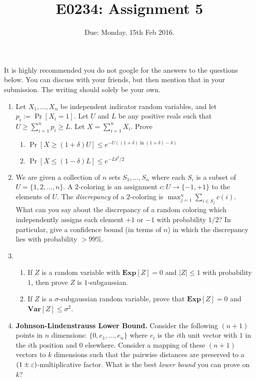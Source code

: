 \documentclass[11pt]{article}
\begin{document}
\def\Exp{\mathbf{Exp}}
\def\Var{\mathbf{Var}}
\title{E0234: Assignment 5}
\author{}
\date{Due: Monday, 15th Feb 2016.}
\maketitle
It is highly recommended you do not google for the answers to the questions below. You can discuss with your friends, but then mention that in your submission.
The writing should solely be your own.

\begin{enumerate}

\item Let $X_1,\ldots , X_n$ be independent indicator random variables, and let $p_i := \Pr[X_i = 1]$.
Let $U$ and $L$ be any positive reals such that $U \geq \sum_{i=1}^n p_i \geq L$. Let $X = \sum_{i=1}^n X_i$.
Prove
\begin{enumerate}
	\item $\Pr\left[X \geq (1+\delta)U\right] \leq e^{-U((1+\delta)\ln(1+\delta) -\delta)}$
	\item $\Pr\left[X \leq (1-\delta)L\right] \leq e^{-L\delta^2/2}$
\end{enumerate}

\item  We are given a collection of $n$ sets $S_1,\ldots,S_n$ where each $S_i$ is a subset of $U = \{1,2,\ldots,n\}$.
A $2$-coloring is an assignment  $c:U \to \{-1,+1\}$ to the elements of $U$.
The {\em discrepancy} of a $2$-coloring is $\max_{j=1}^n \sum_{i\in S_j} c(i)$. 
What can you say about the discrepancy of a random 
coloring which independently assigns each element $+1$ or $-1$ with probability $1/2$? 
In particular, give a confidence bound (in terms of $n$) in which the discrepancy lies with probability $> 99\%$.

\item 
\begin{enumerate}
	\item If $Z$ is a random variable with $\Exp[Z] = 0$ and $|Z| \leq 1$ with probability $1$, then prove $Z$ is $1$-subgaussian.
	\item If $Z$ is a $\sigma$-subgaussian random variable, prove that $\Exp[Z] = 0$ and $\Var[Z] \leq \sigma^2$. 
\end{enumerate}

\item {\bf Johnson-Lindenstrauss Lower Bound.} Consider the following $(n+1)$ points in $n$ dimensions: $\{0,e_1,\ldots,e_n\}$
where $e_i$ is the $i$th unit vector with $1$ in the $i$th position and $0$ elsewhere. 
Consider a mapping of these $(n+1)$ vectors to $k$ dimensions such that the pairwise distances are preserved to a $(1\pm \varepsilon)$-multiplicative factor.
What is the best {\em lower bound} you can prove on $k$? 

\end{enumerate}
\end{document}
